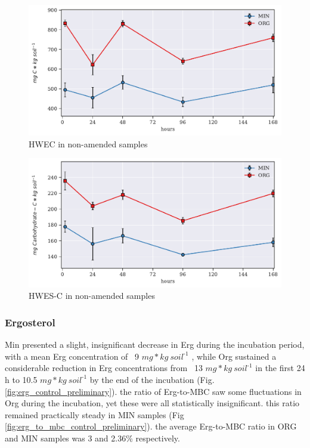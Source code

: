 \documentclass[12pt]{report}
\newlength{\SpaceAfterUnit}
\newcommand{\genericunit}{$ mg * kg\ soil^{\text{-}1}$ \hspace*{\SpaceAfterUnit}}
\begin{document}
        \begin{figure}[H]
            \centering
            \includegraphics[scale=0.8]{thesis_figures/preliminary/control/HWEC.pdf}
            \caption{HWEC in non-amended samples}
            \label{fig:hwec_control_preliminary}
        \end{figure}
        
        \begin{figure}[H]
            \centering
            \includegraphics[scale=0.8]{thesis_figures/preliminary/control//HWES-C.pdf}
            \caption{HWES-C in non-amended samples}
            \label{fig:hwes-c_control_preliminary}
        \end{figure}
   
    \subsubsection{Ergosterol}
        Min presented a slight, insignificant decrease in Erg during the incubation period, with a mean Erg concentration of ~9 \genericunit, while Org sustained a considerable reduction in Erg concentrations from ~13 \genericunit in the first 24 h to 10.5 \genericunit by the end of the incubation (Fig. \ref{fig:erg_control_preliminary}). the ratio of Erg-to-MBC saw some fluctuations in Org during the incubation, yet these were all statistically insignificant. this ratio remained practically steady in MIN samples (Fig \ref{fig:erg_to_mbc_control_preliminary}). the average Erg-to-MBC ratio in ORG and MIN samples was 3 and 2.36\% respectively.
        
\end{document}
